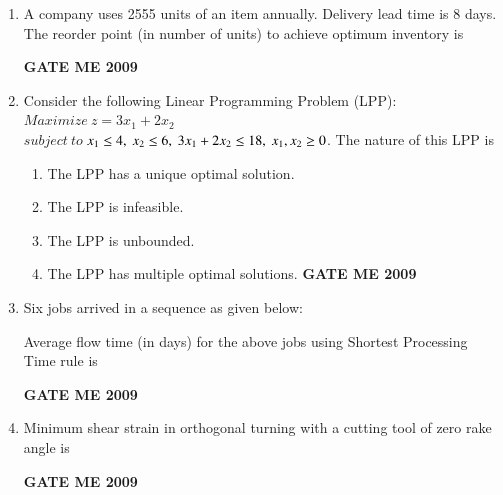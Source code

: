 \documentclass[journal]{IEEEtran}
\begin{document}
\begin{enumerate}[leftmargin=0pt]
\item A company uses 2555 units of an item annually. Delivery lead time is 8 days. The reorder point (in number of units) to achieve optimum inventory is
\begin{enumerate}
\hfill{\textbf{GATE ME 2009}}
\end{enumerate}

\item Consider the following Linear Programming Problem (LPP): \\      $Maximize \ z = 3x_1 + 2x_2$ \\$subject\  to\   $$x_1 \leq 4,\\\ x_2 \leq 6,\\\ 3x_1 + 2x_2 \leq 18,\\\ x_1, x_2 \geq 0$. The nature of this LPP is
\begin{enumerate}
  \item The LPP has a unique optimal solution.
  \item The LPP is infeasible.
  \item The LPP is unbounded.
  \item The LPP has multiple optimal solutions.
\hfill{\textbf{GATE ME 2009}}
\end{enumerate}
\newpage
\item Six jobs arrived in a sequence as given below:\\
\begin{table}[h]
    \centering
    
\end{table}

Average flow time (in days) for the above jobs using Shortest Processing Time rule is
\begin{enumerate}
\hfill{\textbf{GATE ME 2009}}
\end{enumerate}

\item Minimum shear strain in orthogonal turning with a cutting tool of zero rake angle is
\begin{enumerate}
\hfill{\textbf{GATE ME 2009}}
\end{enumerate}



\end{enumerate}
\end{document}
